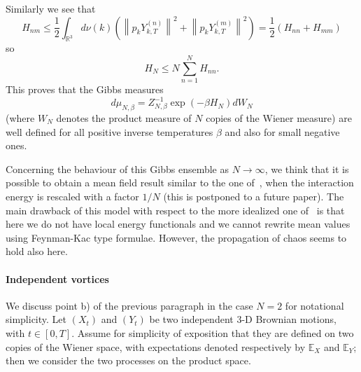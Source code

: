 Similarly we see that
\begin{equation*}
H_{nm}\leq \frac{1}{2}\int_{\mathbb{R}^{3}}d\nu \left( k\right) \left(
\left\| p_{k}Y_{k,T}^{\left( n\right) }\right\| ^{2}+\left\|
p_{k}Y_{k,T}^{\left( m\right) }\right\| ^{2}\right) =\frac{1}{2}\left(
H_{nn}+H_{mm}\right) 
\end{equation*}
so
\begin{equation*}
H_{N}\leq N\sum_{n=1}^{N}H_{nn}.
\end{equation*}
This proves that the Gibbs measures 
$$
d\mu _{N,\beta }=Z_{N,\beta }^{-1}\exp \left( -\beta H_{N}\right) dW_{N}
$$ (where $W_{N}$ denotes the product
measure of $N$ copies of the Wiener measure) are well defined for all
positive inverse temperatures $\beta $ and also for small negative ones.

Concerning the behaviour of this Gibbs ensemble as $N\rightarrow \infty $,
we think that it is possible to obtain a mean field result similar to the
one of~\cite{PLL - M}, when the interaction energy is rescaled with a
factor $1/N$ 
(this is postponed to a future paper). The main drawback of
this model with respect to the more idealized one of~\cite{PLL - M} is that
here we do not have local energy functionals and we cannot rewrite mean
values using Feynman-Kac type formulae. However, the propagation of
chaos seems to hold also here.

\paragraph{Independent vortices}
We discuss point b) of the previous paragraph in the case $N=2$ for notational
simplicity. Let $(X_{t})$ and $\left( Y_{t}\right) $ be two independent
3-D Brownian motions, with $t\in \left[ 0,T\right] $. Assume for
simplicity of exposition that they are defined on two copies of the Wiener
space, with expectations denoted respectively by $\mathbb{E}_{X}$ and $%
\mathbb{E}_{Y}$; then we consider the two processes on the product space.

